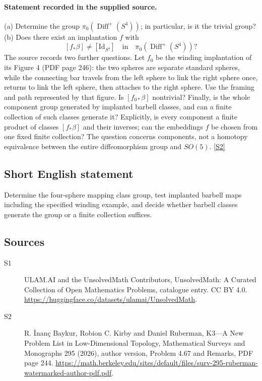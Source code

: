 \documentclass[11pt]{article}
\newcommand{\sref}[2]{\hyperlink{source:#1:#2}{[S#2]}}
\begin{document}
\paragraph{Statement recorded in the supplied source.}
(a) Determine the group $\pi_0(\operatorname{Diff}^+(S^4))$; in particular, is it the trivial group? (b) Does there exist an implantation $f$ with
\[
[f_*\beta]\ne[\mathrm{Id}_{S^4}]\quad\text{in}\quad\pi_0(\operatorname{Diff}^+(S^4))?
\]
The source records two further questions. Let $f_0$ be the winding implantation of its Figure 4 (PDF page 246): the two spheres are separate standard spheres, while the connecting bar travels from the left sphere to link the right sphere once, returns to link the left sphere, then attaches to the right sphere. Use the framing and path represented by that figure. Is $[f_{0*}\beta]$ nontrivial? Finally, is the whole component group generated by implanted barbell classes, and can a finite collection of such classes generate it? Explicitly, is every component a finite product of classes $[f_*\beta]$ and their inverses; can the embeddings $f$ be chosen from one fixed finite collection? The question concerns components, not a homotopy equivalence between the entire diffeomorphism group and $SO(5)$. \sref{statement}{2}
\subsection{Short English statement}
Determine the four-sphere mapping class group, test implanted barbell maps including the specified winding example, and decide whether barbell classes generate the group or a finite collection suffices.
\subsection{Sources}
\begin{description}
\item[\hypertarget{source:statement:1}{S1}] ULAM.AI and the UnsolvedMath Contributors, UnsolvedMath: A Curated Collection of Open Mathematics Problems, catalogue entry. CC BY 4.0. \url{https://huggingface.co/datasets/ulamai/UnsolvedMath}.
\item[\hypertarget{source:statement:2}{S2}] R. İnanç Baykur, Robion C. Kirby and Daniel Ruberman, K3—A New Problem List in Low-Dimensional Topology, Mathematical Surveys and Monographs 295 (2026), author version, Problem 4.67 and Remarks, PDF page 244. \url{https://math.berkeley.edu/sites/default/files/surv-295-ruberman-watermarked-author-pdf.pdf}.
\end{description}
\label{end:statement}
\end{document}
